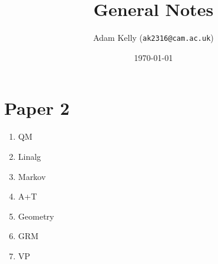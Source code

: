 \documentclass[a4paper]{amsart}
\title{General Notes}
\author{Adam Kelly (\texttt{ak2316@cam.ac.uk})}
\date{\today}
\begin{document}
\maketitle

\section{Paper 2}

\begin{enumerate}
	\item QM
	\item Linalg
	\item Markov
	\item A+T
	\item Geometry
	\item GRM 
	\item VP
\end{enumerate}
\end{document}
